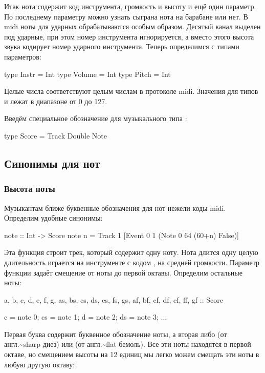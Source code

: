 Итак нота содержит код инструмента, громкость и высоту и ещё один
параметр. По последнему параметру можно узнать сыграна нота на барабане
или нет. В midi ноты для ударных обрабатываются особым образом. Десятый
канал выделен под ударные, при этом номер инструмента игнорируется, а
вместо этого высота звука кодирует номер ударного инструмента. Теперь
определимся с типами параметров:


\begin{code}
type Instr  = Int
type Volume = Int
type Pitch  = Int
\end{code}

Целые числа соответствуют целым числам в протоколе midi. Значения для
типов  и  лежат в диапазоне от 0 до 127.

Введём специальное обозначение для музыкального типа :


\begin{code}
type Score = Track Double Note
\end{code}

\subsection{Синонимы для нот}

\subsubsection{Высота ноты}

Музыкантам ближе буквенные обозначения для нот нежели коды midi.
Определим удобные синонимы:


\begin{code}
note :: Int -> Score
note n = Track 1 [Event 0 1 (Note 0 64 (60+n) False)]
\end{code}

Эта функция строит трек, который содержит одну ноту. Нота длится одну
целую длительность играется на инструменте с кодом , на средней
громкости. Параметр функции задаёт смещение от ноты до первой октавы.
Определим остальные ноты:


\begin{code}
a, b, c, d, e, f, g,
    as, bs, cs, ds, es, fs, gs,
    af, bf, cf, df, ef, ff, gf :: Score

c = note 0;    cs = note 1;    d = note 2;    ds = note 3;	
...
\end{code}

Первая буква содержит буквенное обозначение ноты, а вторая либо 
(от англ.\textasciitilde{}sharp диез) или  (от
англ.\textasciitilde{}flat бемоль). Все эти ноты находятся в первой
октаве, но смещением высоты на 12 единиц мы легко можем смещать эти ноты
в любую другую октаву:


